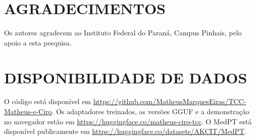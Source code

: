 \documentclass{ieeeaccess}
\begin{document}
\section*{AGRADECIMENTOS}
Os autores agradecem ao Instituto Federal do Paran\'a, Campus Pinhais, pelo apoio a esta pesquisa.

\section*{DISPONIBILIDADE DE DADOS}
O c\'odigo est\'a dispon\'ivel em \url{https://github.com/MatheusMarquesEiras/TCC-Matheus-e-Ciro}. Os adaptadores treinados, as vers\~oes GGUF e a demonstra\c{c}\~ao no navegador est\~ao em \url{https://huggingface.co/matheus-ciro-tcc}. O MedPT est\'a dispon\'ivel publicamente em \url{https://huggingface.co/datasets/AKCIT/MedPT}.
\end{document}
